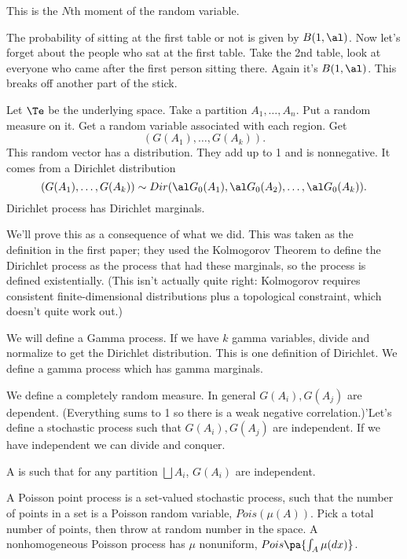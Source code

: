 This is the $N$th moment of the random variable. 

The probability of sitting at the first table or not is given by $B(1,\al)$. Now let's forget about the people who sat at the first table. Take the 2nd table, look at everyone who came after the first person sitting there. Again it's $B(1,\al)$. %
This breaks off another part of the stick.

Let $\Te$ be the underlying space. Take a partition $A_1,\ldots, A_n$. Put a random measure on it. Get a random variable associated with each region. Get $$(G(A_1),\ldots, G(A_k)).$$ This random vector has a distribution. They add up to 1 and is nonnegative. It comes from a Dirichlet distribution
$$
(G(A_1),\ldots, G(A_k)) \sim Dir(\al G_0(A_1),\al G_0(A_2),\ldots, \al G_0(A_k)).
$$
Dirichlet process has Dirichlet marginals.

We'll prove this as a consequence of what we did. This was taken as the definition in the first paper; they used the Kolmogorov Theorem to define the Dirichlet process as the process that had these marginals, so the process is defined existentially. (This isn't actually quite right: Kolmogorov requires  consistent finite-dimensional distributions plus a topological constraint, which doesn't quite work out.)

We will define a Gamma process.
%
If we have $k$ gamma variables, divide and normalize to get the Dirichlet distribution. This is one definition of Dirichlet.
We define a gamma process which has gamma marginals. 

We define a completely random measure. In general $G(A_i), G(A_j)$ are dependent. (Everything sums to 1 so there is a weak negative correlation.)'Let's define a stochastic process such that $G(A_i),G(A_j)$ are independent. If we have independent we can divide and conquer. 
\begin{df}
A  is such that 
for any partition $\bigsqcup A_i$, $G(A_i)$ are independent.
\end{df}

A Poisson point process is a set-valued stochastic process, such that the number of points in a set is a Poisson random variable, $Pois(\mu(A))$. Pick a total number of points, then throw at random number in the space. A nonhomogeneous Poisson process has $\mu$ nonuniform, $Pois\pa{\int_A \mu(dx)}$.

